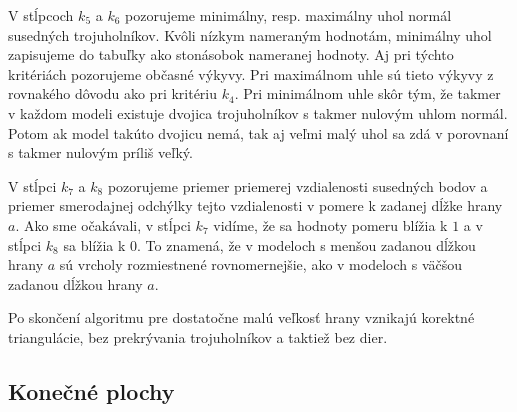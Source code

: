V stĺpcoch $k_5$ a $k_6$ pozorujeme minimálny, resp. maximálny uhol normál susedných trojuholníkov.
Kvôli nízkym nameraným hodnotám, minimálny uhol zapisujeme do tabuľky ako stonásobok nameranej hodnoty. Aj 
pri týchto kritériách pozorujeme občasné výkyvy. Pri maximálnom uhle sú tieto výkyvy z rovnakého dôvodu
ako pri kritériu $k_4$. Pri minimálnom uhle skôr tým, že takmer v každom modeli existuje dvojica trojuholníkov
s takmer nulovým uhlom normál. Potom ak model takúto dvojicu nemá, tak aj veľmi malý uhol sa zdá v porovnaní s takmer
nulovým príliš veľký.

V stĺpci $k_7$ a $k_8$ pozorujeme priemer priemerej vzdialenosti susedných bodov a priemer smerodajnej odchýlky 
tejto vzdialenosti v pomere k zadanej dĺžke hrany $a$. Ako sme očakávali, v stĺpci $k_7$ vidíme, že sa hodnoty pomeru
blížia k $1$ a v stĺpci $k_8$ sa blížia k $0$. To znamená, že v modeloch s menšou zadanou dĺžkou hrany $a$ sú 
vrcholy rozmiestnené rovnomernejšie, ako v modeloch s väčšou zadanou dĺžkou hrany $a$.

Po skončení algoritmu pre dostatočne malú veľkosť hrany vznikajú korektné triangulácie,
bez prekrývania trojuholníkov a taktiež bez dier.
\newpage
\subsection{Konečné plochy}

